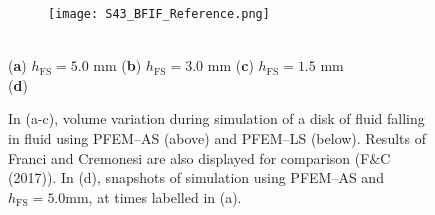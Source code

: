 \documentclass[final,3p,times]{elsarticle}
\begin{document}
\begin{figure}[t!]
\captionsetup[subfigure]{labelformat=empty}
\centering 
	\begin{subfigure}[b]{1.00\textwidth}
		\texttt{[image: S43\_BFIF\_Reference.png]}
		\caption{}
		\label{Fig:BFIF_reference_a}
	\end{subfigure}
	\\
	\vspace{-37mm}
	\hspace{5mm} \footnotesize{(\textbf{a}) $h_\mathrm{FS} = 5.0$ mm}
	\hspace{32mm} (\textbf{b}) $h_\mathrm{FS} = 3.0$ mm 
	\hspace{32mm} (\textbf{c}) $h_\mathrm{FS} = 1.5$ mm 
	\vspace{5mm}\\
	\hspace{-160mm} (\textbf{d})
	\vspace{20mm}\\
	\begin{subfigure}[b]{0.00\textwidth}
		\caption{}\label{Fig:BFIF_reference_b}
	\end{subfigure}
	\begin{subfigure}[b]{0.00\textwidth}
		\caption{}\label{Fig:BFIF_reference_c}
	\end{subfigure}
	\begin{subfigure}[b]{0.00\textwidth}
		\caption{}\label{Fig:BFIF_reference_d}
	\end{subfigure}
	\vspace{-6mm}
\caption{In (a-c), volume variation during simulation of a disk of fluid falling in fluid using PFEM--AS (above) and PFEM--LS (below). Results of Franci and Cremonesi \citep{franci2017effect} are also displayed for comparison (F$\&$C (2017)). In (d), snapshots of simulation using PFEM--AS and $h_\mathrm{FS} = 5.0 $mm, at times labelled in (a). 
}
\label{Fig:BFIF_reference}
\end{figure}
\end{document}
